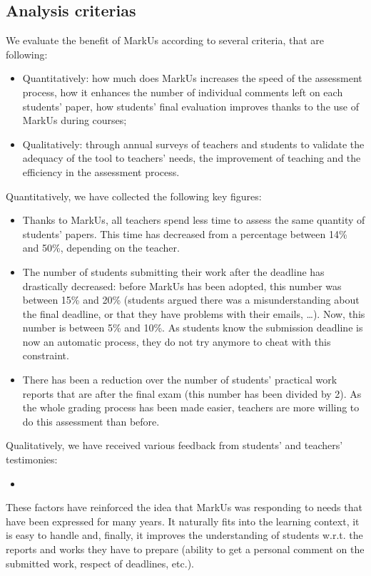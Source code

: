 \documentclass[twocolumn,10pt]{asme2e}
\begin{document}
\subsection*{Analysis criterias}

We evaluate the benefit of MarkUs according to several criteria, that are following: 
\begin{itemize}
\item Quantitatively: how much does MarkUs increases the speed of the assessment process, how it enhances the number of individual comments left on each students' paper, how students' final evaluation improves thanks to the use of MarkUs during courses;
\item Qualitatively: through annual surveys of teachers and students to validate the adequacy of the tool to teachers' needs, the improvement of teaching and the efficiency in the assessment process.
\end{itemize}

Quantitatively, we have collected the following key figures: 
\begin{itemize}
\item Thanks to MarkUs, all teachers spend less time to assess the same quantity of students' papers. This time has decreased from a percentage between 14\% and 50\%, depending on the teacher. 
\item The number of students submitting their work after the deadline has drastically decreased: before MarkUs has been adopted, this number was between 15\% and 20\% (students argued there was a misunderstanding about the final deadline, or that they have problems with their emails, …).  Now, this number is between 5\% and 10\%. As students know the submission deadline is now an automatic process, they do not try anymore to cheat with this constraint. 
\item There has been a reduction over the number of students' practical work reports that are after the final exam (this number has been divided by 2). As the whole grading process has been made easier, teachers are more willing to do this assessment than before. 
\end{itemize}

Qualitatively, we have received various feedback from students' and teachers' testimonies: 
\begin{itemize}
\item %
\end{itemize}

These factors have reinforced the idea that MarkUs was responding to needs that have been expressed for many years. It naturally fits into the learning context, it is easy to handle and, finally, it improves the understanding of students w.r.t. the reports and works they have to prepare (ability to get a personal comment on the submitted work, respect of deadlines, etc.).
\end{document}
